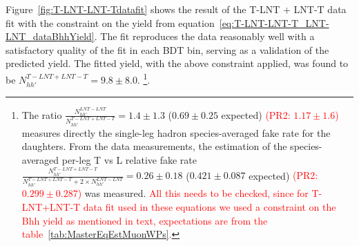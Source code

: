 Figure~\ref{fig:T-LNT-LNT-Tdatafit} shows the result of the T-LNT + LNT-T data fit with the constraint on the \Bhh yield from equation~\ref{eq:T-LNT-LNT-T_LNT-LNT_dataBhhYield}. 
The fit reproduces the data reasonably well with a satisfactory quality of the fit in each BDT bin, serving as a validation of the predicted \Bhh yield.  
The fitted \Bhh yield, with the above constraint applied, was found to be $N^{T-LNT+LNT-T}_{hh'} = 9.8 \pm 8.0$.  \footnote{The ratio $\frac{N_{hh'}^{LNT-LNT}}{N_{hh'}^{T-LNT+LNT-T}} = 1.4 \pm 1.3$ ($0.69 \pm 0.25$ expected) \textcolor{red}{(PR2: $1.17 ± 1.6$)} measures directly the single-leg hadron species-averaged fake rate for the \Bhh daughters. 
From the data measurements, the estimation of the species-averaged per-leg T vs L relative fake rate $\frac{N_{hh'}^{T-LNT+LNT-T}}{N_{hh'}^{T-LNT+LNT-T} + 2 \times N_{hh'}^{LNT-LNT}} = 0.26 \pm 0.18$ ($0.421 \pm 0.087$ expected) \textcolor{red}{(PR2: $0.299 \pm 0.287$)} was measured. \textcolor{red}{All this needs to be checked, since for T-LNT+LNT-T data fit used in these equations we used a constraint on the Bhh yield as mentioned in text, expectations are from the table~\ref{tab:MasterEqEstMuonWPs}.}}. 
